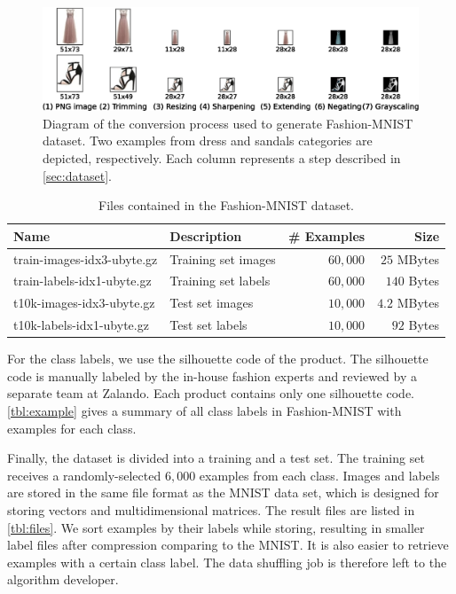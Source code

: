 \documentclass{article}
\newcommand{\fmnist}{Fashion-MNIST\xspace}
\begin{document}
\begin{figure}[h]
  \centering
  \includegraphics[width=1.0\textwidth]{fig1}
  \caption{Diagram of the conversion process used to generate \fmnist dataset. Two examples from dress and sandals categories are depicted, respectively. Each column represents a step described in \autoref{sec:dataset}.\label{fig:convert}}
\end{figure}

\begin{table}[htbp]
  \caption{Files contained in the \fmnist dataset. \label{tbl:files}}
  \centering
  \begin{tabular}{llrr}
    \toprule
    Name     & Description     & \# Examples & Size \\
    \midrule
    train-images-idx3-ubyte.gz     & Training set images & $60,000$ & $25$ MBytes \\
    train-labels-idx1-ubyte.gz & Training set labels & $60,000$ & $140$ Bytes \\
    t10k-images-idx3-ubyte.gz & Test set images  & $10,000$ & $4.2$ MBytes \\
    t10k-labels-idx1-ubyte.gz     & Test set labels & $10,000$ & $92$ Bytes\\
    \bottomrule
  \end{tabular}
\end{table}
For the class labels, we use the silhouette code of the product. The silhouette code is manually labeled by the in-house fashion experts and reviewed by a separate team at Zalando. Each product contains only one silhouette code. \autoref{tbl:example} gives a summary of all class labels in \fmnist with examples for each class.




Finally, the dataset is divided into a training and a test set. The training set receives a randomly-selected $6,000$ examples from each class. Images and labels are stored in the same file format as the MNIST data set, which is designed for storing vectors and multidimensional matrices. The result files are listed in \autoref{tbl:files}. We sort examples by their labels while storing, resulting in smaller label files after compression comparing to the MNIST. It is also easier to retrieve examples with a certain class label. The data shuffling job is therefore left to the algorithm developer.
\end{document}
